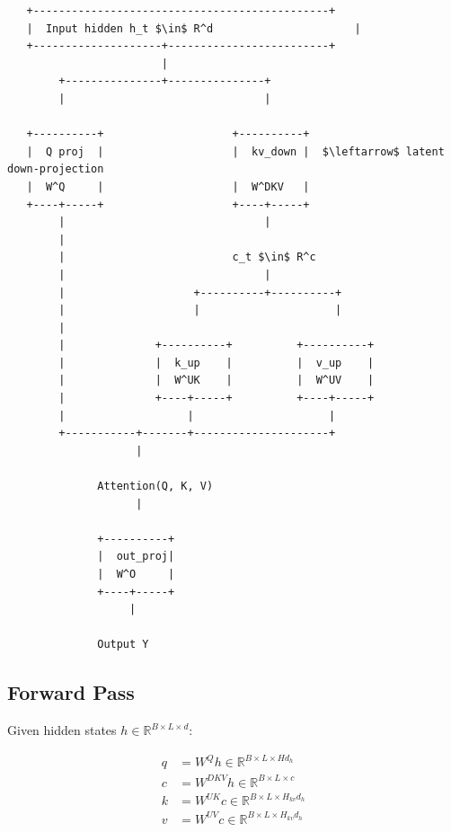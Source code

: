 \begin{lstlisting}
   +----------------------------------------------+
   |  Input hidden h_t $\in$ R^d                      |
   +--------------------+-------------------------+
                        |
        +---------------+---------------+
        |                               |
                                         
   +----------+                    +----------+
   |  Q proj  |                    |  kv_down |  $\leftarrow$ latent down-projection
   |  W^Q     |                    |  W^DKV   |
   +----+-----+                    +----+-----+
        |                               |
        |                                
        |                          c_t $\in$ R^c
        |                               |
        |                    +----------+----------+
        |                    |                     |
        |                                           
        |              +----------+          +----------+
        |              |  k_up    |          |  v_up    |
        |              |  W^UK    |          |  W^UV    |
        |              +----+-----+          +----+-----+
        |                   |                     |
        +-----------+-------+---------------------+
                    |
                     
              Attention(Q, K, V)
                    |
                     
              +----------+
              |  out_proj|
              |  W^O     |
              +----+-----+
                   |
                    
              Output Y
\end{lstlisting}

\subsection{Forward Pass}

Given hidden states $h \in \mathbb{R}^{B \times L \times d}$:

\[
\begin{aligned}
q &= W^Q h \in \mathbb{R}^{B \times L \times H d_h} \\
c &= W^{DKV} h \in \mathbb{R}^{B \times L \times c} \\
k &= W^{UK} c \in \mathbb{R}^{B \times L \times H_{kv} d_h} \\
v &= W^{UV} c \in \mathbb{R}^{B \times L \times H_{kv} d_h}
\end{aligned}
\tag{4.1}
\]

